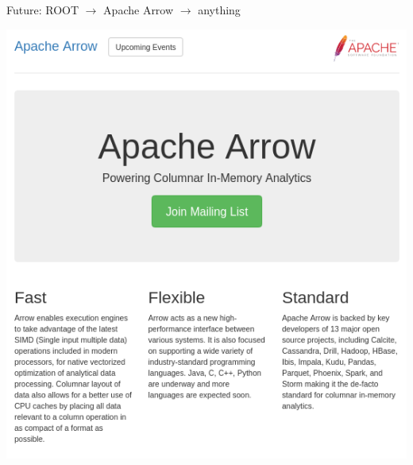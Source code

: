 \documentclass{beamer}
\begin{document}
\begin{frame}{Future: ROOT $\to$ Apache Arrow $\to$ anything}
\vspace{0.25 cm}
\begin{center}
\includegraphics[width=0.7\linewidth]{arrow.png}
\end{center}
\end{frame}
\end{document}
